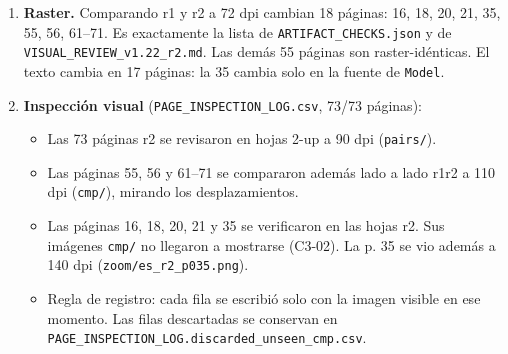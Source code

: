 \documentclass[
]{article}
\providecommand{\tightlist}{%
  \setlength{\itemsep}{0pt}\setlength{\parskip}{0pt}}
\begin{document}
\begin{enumerate}
\begin{itemize}
    \begin{itemize}
    \tightlist
    \item
      1 y 2, p. 55: la línea «La absorción da mín(u\_w,v\_w) ≤
      \textbar M\_w\textbar+t\_W+L\ldots» de r1 tenía el espaciado
      matemático comprimido; en r2 se reparte normalmente. La fórmula es
      la misma.
    \item
      3, p. 65--66: en r1, la Tabla 9 se partía entre páginas y repetía
      el encabezado «Enunciado / Declaración»; en r2 cabe en p. 65, así
      que el encabezado aparece una sola vez. Las 10 filas están
      presentes.
    \end{itemize}
  \item
    La bibliografía del PDF es idéntica.
  \item
    El log de compilación no tiene Overfull, «Missing character»,
    referencias indefinidas ni errores. Hay 5 avisos de Underfull, ya
    declarados por el editor.
  \item
    El preámbulo TeX (40 líneas) es idéntico al de r1.
  \end{itemize}
\item
  \textbf{Raster.} Comparando r1 y r2 a 72 dpi cambian 18 páginas: 16,
  18, 20, 21, 35, 55, 56, 61--71. Es exactamente la lista de
  \texttt{ARTIFACT\_CHECKS.json} y de
  \texttt{VISUAL\_REVIEW\_v1.22\_r2.md}. Las demás 55 páginas son
  raster-idénticas. El texto cambia en 17 páginas: la 35 cambia solo en
  la fuente de \texttt{Model}.
\item
  \textbf{Inspección visual} (\texttt{PAGE\_INSPECTION\_LOG.csv}, 73/73
  páginas):

  \begin{itemize}
  \tightlist
  \item
    Las 73 páginas r2 se revisaron en hojas 2-up a 90 dpi
    (\texttt{pairs/}).
  \item
    Las páginas 55, 56 y 61--71 se compararon además lado a lado
    r1\textbar r2 a 110 dpi (\texttt{cmp/}), mirando los
    desplazamientos.
  \item
    Las páginas 16, 18, 20, 21 y 35 se verificaron en las hojas r2. Sus
    imágenes \texttt{cmp/} no llegaron a mostrarse (C3-02). La p. 35 se
    vio además a 140 dpi (\texttt{zoom/es\_r2\_p035.png}).
  \item
    Regla de registro: cada fila se escribió solo con la imagen visible
    en ese momento. Las filas descartadas se conservan en
    \texttt{PAGE\_INSPECTION\_LOG.discarded\_unseen\_cmp.csv}.
  \end{itemize}
\end{enumerate}
\end{document}
